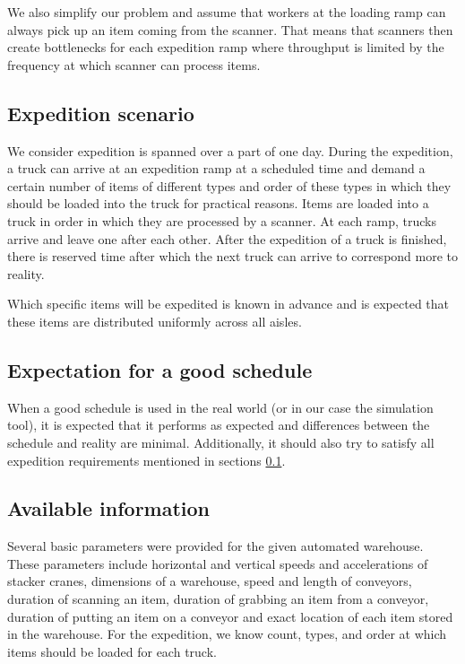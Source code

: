 \documentclass{ctuthesis}
\begin{document}
We also simplify our problem and assume that workers at the loading ramp can always pick up an item coming from the scanner. That means that scanners then create bottlenecks for each expedition ramp where throughput is limited by the frequency at which scanner can process items.

\subsection{Expedition scenario}
\label{expedition}
We consider expedition is spanned over a part of one day. During the expedition, a truck can arrive at an expedition ramp at a scheduled time and demand a certain number of items of different types and order of these types in which they should be loaded into the truck for practical reasons. Items are loaded into a truck in order in which they are processed by a scanner. At each ramp, trucks arrive and leave one after each other. After the expedition of a truck is finished, there is reserved time after which the next truck can arrive to correspond more to reality. 

Which specific items will be expedited is known in advance and is expected that these items are distributed uniformly across all aisles.

\subsection{Expectation for a good schedule}

When a good schedule is used in the real world (or in our case the simulation tool), it is expected that it performs as expected and differences between the schedule and reality are minimal. Additionally, it should also try to satisfy all expedition requirements mentioned in sections \ref{expedition}.

\subsection{Available information}

Several basic parameters were provided for the given automated warehouse. These parameters include horizontal and vertical speeds and accelerations of stacker cranes, dimensions of a warehouse, speed and length of conveyors, duration of scanning an item, duration of grabbing an item from a conveyor, duration of putting an item on a conveyor and exact location of each item stored in the warehouse. For the expedition, we know count, types, and order at which items should be loaded for each truck. 
\end{document}
